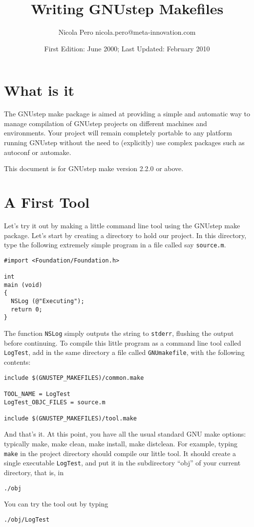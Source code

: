 \documentclass[a4paper]{article}
\begin{document}
\author{Nicola Pero nicola.pero@meta-innovation.com}
\title{Writing GNUstep Makefiles}
\date{First Edition: June 2000; Last Updated: February 2010}
\maketitle

\section{What is it}
The GNUstep make package is aimed at providing a simple and automatic
way to manage compilation of GNUstep projects on different machines
and environments.  Your project will remain completely portable to any
platform running GNUstep without the need to (explicitly) use complex
packages such as autoconf or automake.

This document is for GNUstep make version 2.2.0 or above.

\section{A First Tool}
Let's try it out by making a little command line tool using the
GNUstep make package.  Let's start by creating a directory to hold our
project.  In this directory, type the following extremely simple
program in a file called say \texttt{source.m}.
\begin{verbatim}
#import <Foundation/Foundation.h>

int
main (void)
{ 
  NSLog (@"Executing");
  return 0;
}
\end{verbatim}
The function \texttt{NSLog} simply outputs the string to
\texttt{stderr}, flushing the output before continuing.  To compile
this little program as a command line tool called \texttt{LogTest},
add in the same directory a file called \texttt{GNUmakefile}, with the
following contents:
\begin{verbatim}
include $(GNUSTEP_MAKEFILES)/common.make

TOOL_NAME = LogTest
LogTest_OBJC_FILES = source.m

include $(GNUSTEP_MAKEFILES)/tool.make
\end{verbatim}
And that's it.
At this point, you have all the usual standard GNU make options:
typically make, make clean, make install, make distclean.  For
example, typing \texttt{make} in the project directory should compile
our little tool.
It should create a single executable \texttt{LogTest}, and put it in
the subdirectory ``obj'' of your current directory, that is, in
\begin{verbatim}
./obj
\end{verbatim}
You can try the tool out by typing
\begin{verbatim}
./obj/LogTest
\end{verbatim}
\end{document}
